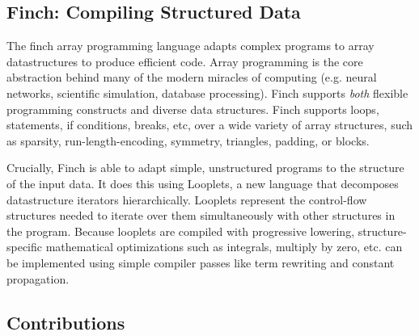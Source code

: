 \documentclass[acmsmall]{acmart}
\begin{document}
\subsection{Finch: Compiling Structured Data}
The finch array programming language adapts complex programs to array datastructures to produce efficient code. Array programming is the core abstraction behind many of the modern miracles of computing (e.g. neural networks, scientific simulation, database processing). Finch supports \textit{both} flexible programming constructs and diverse data structures. Finch supports loops, statements, if conditions, breaks, etc, over a wide variety of array structures, such as sparsity, run-length-encoding, symmetry, triangles, padding, or blocks.

Crucially, Finch is able to adapt simple, unstructured programs to the structure of the input data. It does this using Looplets, a new language that decomposes datastructure iterators hierarchically. Looplets represent the control-flow structures needed to iterate over them simultaneously with other structures in the program. Because looplets are compiled with progressive lowering, structure-specific mathematical optimizations such as integrals, multiply by zero, etc. can be implemented using simple compiler passes like term rewriting and constant propagation.

\subsection{Contributions}
\end{document}
